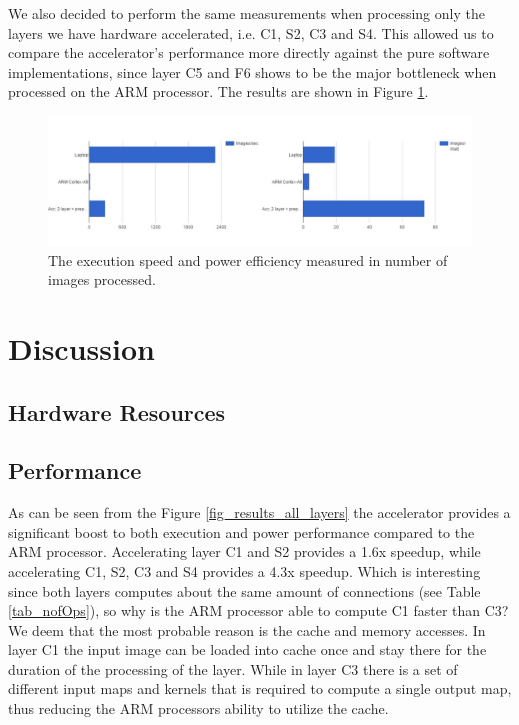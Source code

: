We also decided to perform the same measurements when processing only the layers we have hardware accelerated, i.e. C1, S2, C3 and S4. This allowed us to compare the accelerator's performance more directly against the pure software implementations, since layer C5 and F6 shows to be the major bottleneck when processed on the ARM processor. The results are shown in Figure \ref{fig_results_accelerated_layers}.


\begin{figure}[h!]
	\centering
	\includegraphics[width=1.0\textwidth]{Figures/Results/results_accelerated_layers}
	\caption{The execution speed and power efficiency measured in number of images processed.}
	\label{fig_results_accelerated_layers}
\end{figure}

\section{Discussion} \label{sec_discussion}

\subsection{Hardware Resources}

\subsection{Performance} 

As can be seen from the Figure \ref{fig_results_all_layers} the accelerator provides a significant boost to both execution and power performance compared to the ARM processor. Accelerating layer C1 and S2 provides a 1.6x speedup, while accelerating C1, S2, C3 and S4 provides a 4.3x speedup. Which is interesting since both layers computes about the same amount of connections (see Table \ref{tab_nofOps}), so why is the ARM processor able to compute C1 faster than C3? We deem that the most probable reason is the cache and memory accesses. In layer C1 the input image can be loaded into cache once and stay there for the duration of the processing of the layer. While in layer C3 there is a set of different input maps and kernels that is required to compute a single output map, thus reducing the ARM processors ability to utilize the cache. 

